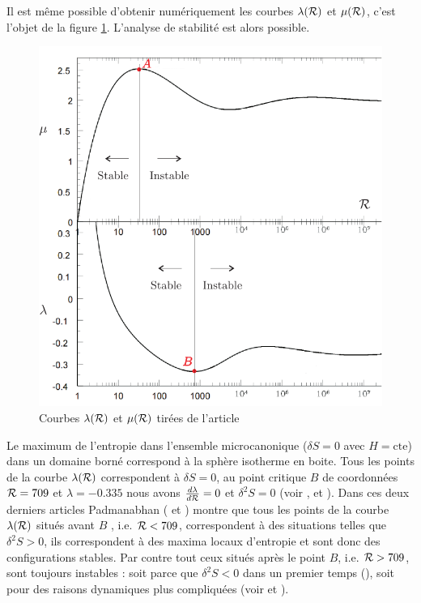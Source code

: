 	Il est même possible d'obtenir numériquement les courbes $\lambda(\mathcal{R})$ et $\mu(\mathcal{R})$, c'est l'objet de la figure \ref{Cal_stab}. L'analyse de stabilité est alors possible. 
	\begin{figure}[h!]
		\centering \includegraphics[scale=1.00]{graphe/calorique_stabilite.pdf}
		\caption{Courbes $\lambda(\mathcal{R})$ et $\mu(\mathcal{R})$ tirées de l'article \cite{2011MNRAS.414.2728Y}}
		\label{Cal_stab}
	\end{figure}
	Le maximum de l'entropie dans l'ensemble microcanonique ($\delta S=0$ avec $H=\mathrm{cte}$) dans un domaine
	borné correspond à la sphère isotherme en boite. Tous les points de la courbe $\lambda(\mathcal{R})$ correspondent à
	$\delta S=0$, au point critique $B$ de coordonnées $\mathcal{R}=709$ et $\lambda=-0.335$ nous avons $\frac{d\lambda}{d\mathcal{R}}=0$ et
	$\delta^2 S=0$ (voir \cite{1968MNRAS.138..495L}, \cite{1989ApJS...71..651P} et \cite{1990PhR...188..285P}). Dans
	ces deux derniers articles Padmanabhan (\cite{1989ApJS...71..651P} et \cite{1990PhR...188..285P}) montre que
	tous les points de la courbe $\lambda(\mathcal{R})$ situés avant $B$ , i.e. $\mathcal{R} < 709$, correspondent à des situations
	telles que $\delta^2 S>0$, ils correspondent à des maxima locaux d'entropie et sont donc des configurations
	stables. Par contre tout ceux situés après le point $B$, i.e. $\mathcal{R} > 709$, sont toujours instables : soit parce
	que $\delta^2 S<0$ dans un premier temps (\cite{1989ApJS...71..651P}), soit pour des raisons dynamiques plus
	compliquées (voir \cite{Katz-Stab} et \cite{1979MNRAS.189..817K}). 
	
